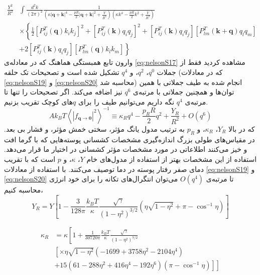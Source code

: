\begin{equation}
\begin{aligned}
\frac{Y^2}{R^2} &\int\frac{d^2k}{(2\pi)^2} \frac{1}{ 
\left( \kappa|\boldsymbol q + \boldsymbol k|^4 - \frac{pR}{2} |\boldsymbol q + \boldsymbol k|^2 + \frac{Y}{R^2} \right)
\left( \kappa k^4 - \frac{pR}{2}k^2 + \frac{Y}{R^2} \right) 
} \\
&\times\left\{ 
\frac{1}{2} \left[ P_{ij}^T(\boldsymbol q)k_ik_j\right]^2 + 
\left[P_{ij}^T(\boldsymbol k)q_iq_j\right]^2 + 
\left[P_{ij}^T(\boldsymbol k)q_iq_j\right] 
\left[P_{lm}^T(\boldsymbol{k+ q})q_lq_m\right] \right.\\
& \left.+ 2\left[P_{ij}^T(\boldsymbol k)q_iq_j\right]
\left[P_{lm}^T(\boldsymbol{q})k_lk_m\right]
\right\}
\label{eq:nelsonS20}
\end{aligned}
\end{equation}
وارون تابع همبستگی هماهنگ که در معادله‌ی \ref{eq:nelsonS17} مشاهده کردید فقط از جملات $q^0$، $q^2$، و $q^4$ تشکیل شده است و تصحیحات تک حلقه (که در معادلات \ref{eq:nelsonS19} و \ref{eq:nelsonS20} محاسبه شد) انجام شده به طیف جملاتی با همین توان‌ها و همچنین جملاتی با مرتبه‌ی $q^6$ نیز اضافه می‌کند. اگر  تصحیحات را تنها تا مرتبه‌ی $q^4$ نگه داریم می‌توانیم طیف را برای $q$های
کوچک تقریب بزنیم. 
\begin{equation}
Ak_BT\left\langle|f_{\boldsymbol q\rightarrow \boldsymbol 0}|^2\right\rangle^{-1} \equiv\kappa_Rq^4-\frac{p_RR}{2}q^2+\frac{Y_R}{R^2}+O(q^6)
\label{eq:nelsonS21}
\end{equation}
 که در بالا $Y_R$، $\kappa_R$، و $p_R$ به ترتیب مدول یانگ مؤثر، سختی خمش مؤثر، و فشار بی بعد. در مقیاس‌های طولی بزرگ اندازه‌گیری مشخصات کشسانی پوسته‌هایی که با گرما افت و خیز می‌کنند اطلاعاتی در مورد مشخصات مؤثر کشسانی در اختیار ما قرار می‌دهد. استفاده از این مشخصات بهتر از استفاده از مدول‌های خام $Y$، $\kappa$، و $p$
است که با تقریب دمای صفر رفتار پوسته در دما توصیف می‌کنند. با استفاده از معادلات \ref{eq:nelsonS19} و \ref{eq:nelsonS20} 
تا مرتبه‌ی $O(q^4)$
می‌توان انتگرال‌های تکانه را برای خود انرژی محاسبه کنیم،
\begin{equation}
Y_R=Y\left[1-\frac{3}{128\pi}\frac{k_BT}{\kappa}\frac{\sqrt\gamma}{(1-\eta^2)^{3/2}}\left(\eta\sqrt{1-\eta^2}+\pi-\cos^{-1}\eta\right)\right]
\label{eq:nelsonS22}
\end{equation}

\begin{equation}
\begin{aligned}
\kappa_R&=\kappa\left[1+\frac{1}{30720\pi}\frac{k_BT}{\kappa}\frac{\sqrt\gamma}{(1-\eta^2)^{7/2}}\right.\\
&\left.\left[\times\eta\sqrt{1-\eta^2}(-1699+3758\eta^2-2104\eta^4) \right.\right.\\
& \left.\left. +15(61-288\eta^2+416\eta^4-192\eta^6)(\pi-\cos^{-1}\eta)\right]\right]
\label{eq:nelsonS23}
\end{aligned}
\end{equation}

